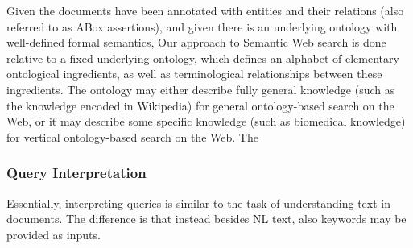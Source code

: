 	Given the documents have been annotated with entities and their relations (also referred to as ABox assertions), and given there is an underlying ontology with well-defined formal semantics, 
	Our approach to Semantic Web search is done relative to a fixed
underlying ontology, which defines an alphabet of elementary
ontological ingredients, as well as terminological relationships between
these ingredients. The ontology may either describe fully
general knowledge (such as the knowledge encoded in Wikipedia)
for general ontology-based search on the Web, or it may describe
some specific knowledge (such as biomedical knowledge) for vertical
ontology-based search on the Web. The



	\subsubsection{Query Interpretation} 
	Essentially, interpreting queries is similar to the task of understanding text in documents. The difference is that instead besides NL text, also keywords may be provided as inputs. 
	
